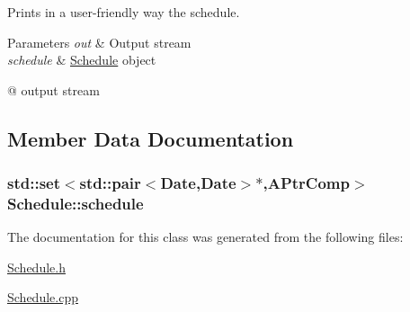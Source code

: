 Prints in a user-\/friendly way the schedule. 


\begin{DoxyParams}{Parameters}
{\em out} & Output stream \\
\hline
{\em schedule} & \hyperlink{classSchedule}{Schedule} object\\
\hline
\end{DoxyParams}
@ output stream 

\subsection{Member Data Documentation}
\subsubsection[{\texorpdfstring{schedule}{schedule}}]{\setlength{\rightskip}{0pt plus 5cm}std\+::set$<$std\+::pair$<${\bf Date},{\bf Date}$>$$\ast$,{\bf A\+Ptr\+Comp}$>$ Schedule\+::schedule\hspace{0.3cm}{\ttfamily [private]}}\hypertarget{classSchedule_a1774807b89cc782ba1a3bafc93b1fb70}{}\label{classSchedule_a1774807b89cc782ba1a3bafc93b1fb70}


The documentation for this class was generated from the following files\+:\begin{DoxyCompactItemize}
\item 
\hyperlink{Schedule_8h}{Schedule.\+h}\item 
\hyperlink{Schedule_8cpp}{Schedule.\+cpp}\end{DoxyCompactItemize}
